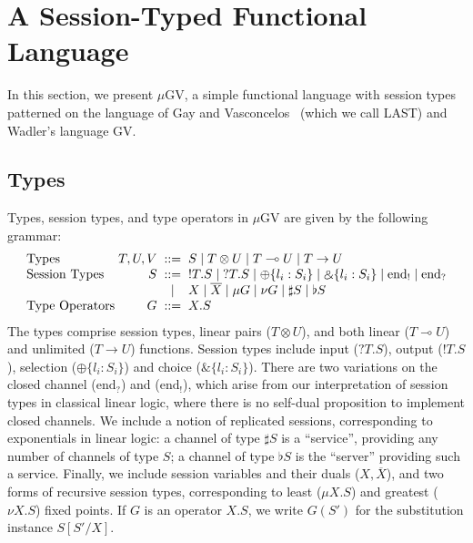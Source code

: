 \documentclass[orivec,envcountsame]{llncs}
\newcommand{\with}{\mathbin\binampersand}
\newcommand{\gvdual}[1]{\overline{#1}}
\newcommand{\gvout}[2]{{!#1.#2}}
\newcommand{\gvin}[2]{{?#1.#2}}
\newcommand{\lto}{\ensuremath{\multimap}}
\newcommand{\uto}{\ensuremath{\rightarrow}}
\newcommand{\outterm}{\mathrm{end}_!}
\newcommand{\interm}{\mathrm{end}_?}
\newcommand{\gvserver}[1]{\flat #1}
\newcommand{\gvservice}[1]{\sharp #1}
\newcommand{\mugv}{$\mu\mathrm{GV}$\xspace}
\begin{document}
\section{A Session-Typed Functional Language}
\label{sec:mugv}

In this section, we present \mugv, a simple functional language with session types patterned on the
language of Gay and Vasconcelos~\cite{GayVasconcelos10} (which we call LAST) and Wadler's language
GV.

\subsection{Types}
\label{sec:mugv-types}

Types, session types, and type operators in \mugv are given by the following grammar:
\[
\begin{array}{l@{\hspace{1mm}}r@{\hspace{2mm}}c@{\hspace{2mm}}l}
  \text{Types}         & T,U,V & ::= & S \mid T \otimes U \mid T \lto U \mid T \uto U \\
  \text{Session Types} & S     & ::= & \gvout{T}{S} \mid \gvin{T}{S}
                                \mid   \oplus \{ l_i : S_i \} \mid \with \{ l_i : S_i \}
                                \mid   \outterm \mid \interm \\
                            & & \mid & X \mid \gvdual{X}
                                \mid   \mu G \mid \nu G
                                \mid   \gvservice{S} \mid \gvserver{S} \\
  \text{Type Operators} & G    & ::= & X.S %
\end{array}
\]%
%
The types comprise session types, linear pairs ($T \otimes U$), and both linear ($T \lto U$) and
unlimited ($T \uto U$) functions.
%
Session types include input ($\gvin{T}{S}$), output ($\gvout{T}{S}$), selection ($\oplus\{ l_i:S_i
\}$) and choice ($\with\{l_i:S_i\}$). There are two variations on the closed channel ($\interm$) and
($\outterm$), which arise from our interpretation of session types in classical linear logic, where
there is no self-dual proposition to implement closed channels. We include a notion of replicated
sessions, corresponding to exponentials in linear logic: a channel of type $\gvservice{S}$ is a
``service'', providing any number of channels of type $S$; a channel of type $\gvserver{S}$ is the
``server'' providing such a service. Finally, we include session variables and their duals
($X,\gvdual{X}$), and two forms of recursive session types, corresponding to least ($\mu X.S$) and
greatest ($\nu X.S$) fixed points. If $G$ is an operator $X.S$, we write $G(S')$ for the
substitution instance $S[S'/X]$.
\end{document}
